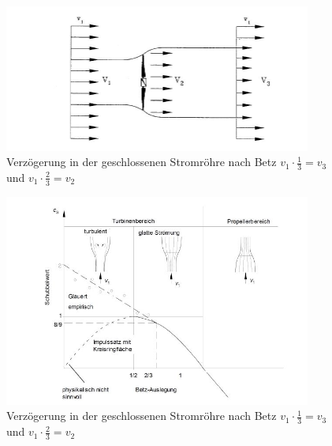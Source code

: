 \begin{figure}[H]
    \centering
    \includegraphics[width=0.9\textwidth]{Abbildungen/Betz.jpg}
    \caption{Verzögerung in der geschlossenen Stromröhre nach Betz $v_{1} \cdot \frac{1}{3}=v_{3}$ und  $v_{1} \cdot \frac{2}{3}=v_{2} $}
    \label{fig:Betz2905}
\end{figure}

\begin{figure}[H]
    \centering
    \includegraphics[width=0.9\textwidth]{Abbildungen/Glauert.jpg}
    \caption{Verzögerung in der geschlossenen Stromröhre nach Betz $v_{1} \cdot \frac{1}{3}=v_{3}$ und  $v_{1} \cdot \frac{2}{3}=v_{2} $}
    \label{fig:Glauert}
\end{figure}
